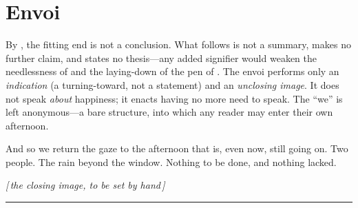 \section*{Envoi}
\label{p19:sec:envoi}

\noindent
By , the fitting end is not a conclusion. What follows is not a summary, makes no further claim, and states no thesis---any added signifier would weaken the needlessness of  and the laying-down of the pen of . The envoi performs only an \emph{indication} (a turning-toward, not a statement) and an \emph{unclosing image}. It does not speak \emph{about} happiness; it enacts having no more need to speak. The ``we'' is left anonymous---a bare structure, into which any reader may enter their own afternoon.

\vspace{1.5em}

\noindent
And so we return the gaze to the afternoon that is, even now, still going on. Two people. The rain beyond the window. Nothing to be done, and nothing lacked.

\vspace{1.0em}


\begin{center}
\itshape\color{rose}
[\,the closing image, to be set by hand\,]
\end{center}

\vspace{2.0em}


\vfill
\noindent\hfill\textcolor{gold}{\rule{0.2\linewidth}{0.4pt}}\hfill\null
